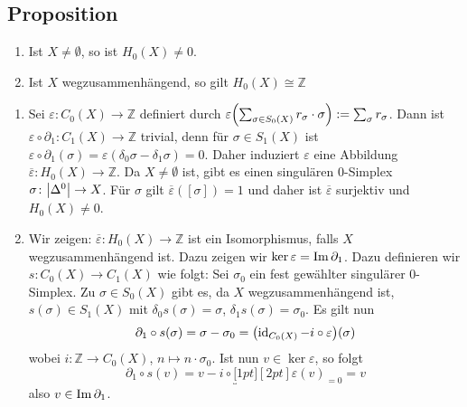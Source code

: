 \subsection[Proposition: Eigenschaften von $H_0(X)$ für $X \not= \emptyset$ und $X$ wegzusammenhängend]{Proposition} %
\label{sub:510}
\begin{enumerate}[1)]
	\item Ist $X \not= \emptyset$, so ist $H_0(X) \not=0$.
	\item Ist $X$ wegzusammenhängend, so gilt $H_0(X) \cong \mathds{Z}$
\end{enumerate}
\begin{enumerate}[1)]
	\item Sei $\varepsilon \colon C_0(X) \to \mathds{Z}$ definiert durch $\varepsilon \enbrace*{\sum_{\sigma \in S_0(X)}r_\sigma \cdot \sigma } := \sum_\sigma r_\sigma$.
	Dann ist $\varepsilon \circ \partial_1 \colon C_1(X) \to \mathds{Z}$ trivial, denn für $\sigma \in S_1(X)$ ist 
	$\varepsilon \circ \partial_1(\sigma)= \varepsilon(\delta_0 \sigma - \delta_1 \sigma) = 0$.
	Daher induziert $\varepsilon$ eine Abbildung 
	$\overline{\varepsilon} \colon H_0(X) \to \mathds{Z}$. Da $X \not= \emptyset$ ist, gibt es einen singulären $0$-Simplex $\sigma \colon \abs*{\Delta^0} \to X$. Für $\sigma$ gilt 
	$\overline{\varepsilon}( [\sigma])=1$ und daher ist $\overline{\varepsilon}$ surjektiv und $H_0(X) \not= 0$.
	\item Wir zeigen: $\overline{\varepsilon} \colon H_0(X) \to \mathds{Z}$ ist ein Isomorphismus, falls $X$ wegzusammenhängend ist. Dazu zeigen wir 
	$\ker \varepsilon = \operatorname{Im} \partial_1$. Dazu definieren wir $s \colon C_0(X) \to C_1(X)$ wie folgt: Sei $\sigma_0$ ein fest gewählter singulärer $0$-Simplex.
	Zu $\sigma \in S_0(X)$ gibt es, da $X$ wegzusammenhängend ist, $s(\sigma) \in S_1(X)$ mit $\delta_0 s(\sigma)= \sigma$, $\delta_1 s(\sigma)= \sigma_0$.
	Es gilt nun 
	\begin{align*}
		\partial_1 \circ s(\sigma) = \sigma - \sigma_0 = \enbrace*{\id_{C_0(X)} - i \circ \varepsilon }(\sigma)
	\end{align*}
	wobei $i \colon \mathds{Z} \to C_0(X)$, $n \mapsto n \cdot \sigma_0$. Ist nun $v \in \ker \varepsilon$, so folgt 
	\[
		\partial_1 \circ s(v)= v- i \circ \underbracket[1pt][2pt]{\varepsilon(v)}_{=0} = v
	\]
	also $v \in \operatorname{Im} \partial_1$. \bewende
	

\end{enumerate}
